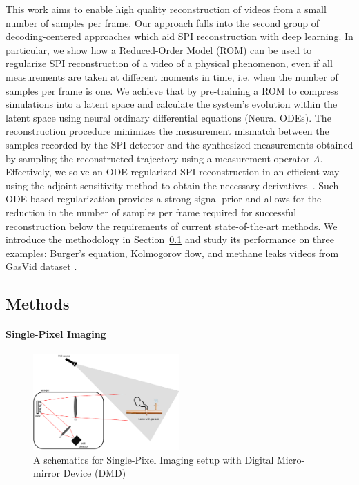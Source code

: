 This work aims to enable high quality reconstruction of videos from a small number of samples per frame. Our approach falls into the second group of decoding-centered approaches which aid SPI reconstruction with deep learning. In particular, we show how a Reduced-Order Model (ROM) can be used to regularize SPI reconstruction of a video of a physical phenomenon, even if all measurements are taken at different moments in time, i.e. when the number of samples per frame is one. We achieve that by pre-training a ROM to compress simulations into a latent space and calculate the system's evolution within the latent space using neural ordinary differential equations (Neural ODEs). The reconstruction procedure minimizes the measurement mismatch between the samples recorded by the SPI detector and the synthesized measurements obtained by sampling the reconstructed trajectory using a measurement operator $A$. Effectively, we solve an ODE-regularized SPI reconstruction in an efficient way using the adjoint-sensitivity method to obtain the necessary derivatives~\citep{chen2018neuralode}. Such ODE-based regularization provides a strong signal prior and allows for the reduction in the number of samples per frame required for successful reconstruction below the requirements of current state-of-the-art methods. We introduce the methodology in Section~\ref{sec:cs_methods} and study its performance on three examples: Burger's equation, Kolmogorov flow, and methane leaks videos from GasVid dataset \citep{wang2020machine}.

\subsection{Methods}
\label{sec:cs_methods}
\paragraph{Single-Pixel Imaging} 

\begin{figure}
\centering
\includegraphics[width = 0.5\textwidth]{figures/SPI_setup.pdf}
\caption{A schematics for Single-Pixel Imaging setup with Digital Micro-mirror Device (DMD) \label{fig:SPI}}
\end{figure}

